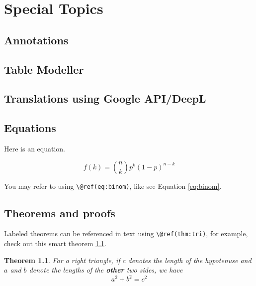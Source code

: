 \documentclass[
]{book}
\newtheorem{theorem}{Theorem}[chapter]
\theoremstyle{definition}
\theoremstyle{definition}
\theoremstyle{definition}
\theoremstyle{definition}
\theoremstyle{remark}
\begin{document}
\hypertarget{special-topics}{%
\chapter{Special Topics}\label{special-topics}}

\hypertarget{annotations}{%
\section{Annotations}\label{annotations}}

\hypertarget{table-modeller}{%
\section{Table Modeller}\label{table-modeller}}

\hypertarget{translations-using-google-apideepl}{%
\section{Translations using Google API/DeepL}\label{translations-using-google-apideepl}}

\hypertarget{equations}{%
\section{Equations}\label{equations}}

Here is an equation.

\begin{equation} 
  f\left(k\right) = \binom{n}{k} p^k\left(1-p\right)^{n-k}
  \label{eq:binom}
\end{equation}

You may refer to using \texttt{\textbackslash{}@ref(eq:binom)}, like see Equation \eqref{eq:binom}.

\hypertarget{theorems-and-proofs}{%
\section{Theorems and proofs}\label{theorems-and-proofs}}

Labeled theorems can be referenced in text using \texttt{\textbackslash{}@ref(thm:tri)}, for example, check out this smart theorem \ref{thm:tri}.

\begin{theorem}
\protect\hypertarget{thm:tri}{}\label{thm:tri}For a right triangle, if \(c\) denotes the \emph{length} of the hypotenuse
and \(a\) and \(b\) denote the lengths of the \textbf{other} two sides, we have
\[a^2 + b^2 = c^2\]
\end{theorem}
\end{document}
